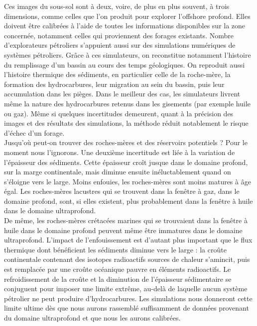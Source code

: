 \documentclass[8pt]{article}
\begin{document}
Ces images du sous-sol sont à deux, voire, de plus en plus souvent, à trois dimensions, comme celles que l'on produit pour explorer l'offshore profond. Elles doivent être calibrées à l'aide de toutes les informations disponibles sur la zone concernée, notamment celles qui proviennent des forages existants. Nombre d'explorateurs pétroliers s'appuient aussi sur des simulations numériques de systèmes pétroliers. Grâce à ces simulateurs, on reconstitue notamment l'histoire du remplissage d'un bassin au cours des temps géologiques. On reproduit aussi l'histoire thermique des sédiments, en particulier celle de la roche-mère, la formation des hydrocarbures, leur migration au sein du bassin, puis leur accumulation dans les pièges. Dans le meilleur des cas, les simulateurs livrent même la nature des hydrocarbures retenus dans les gisements (par exemple huile ou gaz). Même si quelques incertitudes demeurent, quant à la précision des images et des résultats des simulations, la méthode réduit notablement le risque d'échec d'un forage.\\

Jusqu'où peut-on trouver des roches-mères et des réservoirs potentiels ? Pour le moment nous l'ignorons. Une deuxième incertitude est liée à la variation de l'épaisseur des sédiments. Cette épaisseur croît jusque dans le domaine profond, sur la marge continentale, mais diminue ensuite inéluctablement quand on s'éloigne vers le large. Moins enfouies, les roches-mères sont moins matures à âge égal. Les roches-mères lacustres qui se trouvent dans la fenêtre à gaz, dans le domaine profond, sont, si elles existent, plus probablement dans la fenêtre à huile dans le domaine ultraprofond.\\

De même, les roches-mères crétacées marines qui se trouvaient dans la fenêtre à huile dans le domaine profond peuvent même être immatures dans le domaine ultraprofond. L'impact de l'enfouissement est d'autant plus important que le flux thermique dont bénéficient les sédiments diminue vers le large : la croûte continentale contenant des isotopes radioactifs sources de chaleur s'amincit, puis est remplacée par une croûte océanique pauvre en éléments radioactifs. Le refroidissement de la croûte et la diminution de l'épaisseur sédimentaire se conjuguent pour imposer une limite extrême, au-delà de laquelle aucun système pétrolier ne peut produire d'hydrocarbures. Les simulations nous donneront cette limite ultime dès que nous aurons rassemblé suffisamment de données provenant du domaine ultraprofond et que nous les aurons calibrées.\\
\end{document}
